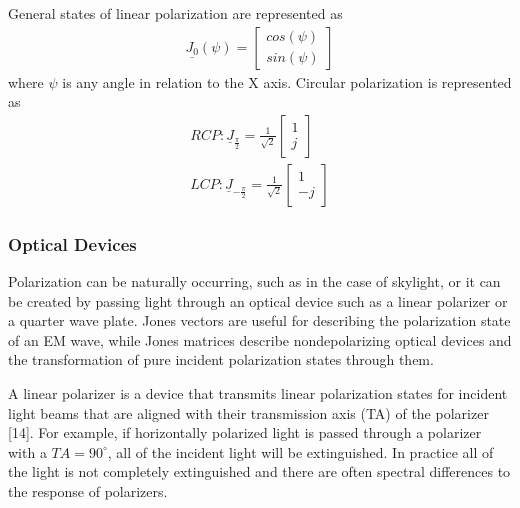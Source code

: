 %
General states of linear polarization are represented as
%
\begin{align}
    \underline{J_0}(\psi) =
    \begin{bmatrix}
        cos(\psi) \\
        sin(\psi)
    \end{bmatrix}
\end{align}
%
where $\psi$ is any angle in relation to the X axis.  Circular polarization is represented as
%
\begin{align}
    RCP: \underline{J}_{\frac{\pi}{2}} = \frac{1}{\sqrt{2}}
    \begin{bmatrix}
        1 \\
        j
    \end{bmatrix} \\
    LCP: \underline{J}_{-\frac{\pi}{2}} = \frac{1}{\sqrt{2}}
    \begin{bmatrix}
        1 \\
        -j
    \end{bmatrix}
\end{align}
%
\subsubsection{Optical Devices}
Polarization can be naturally occurring, such as in the case of skylight, or it can be created by passing light through an optical device such as a linear polarizer or a quarter wave plate.  Jones vectors are useful for describing the polarization state of an EM wave, while Jones matrices describe nondepolarizing optical devices and the transformation of pure incident polarization states through them.

A linear polarizer is a device that transmits linear polarization states for incident light beams that are aligned with their transmission axis (TA) of the polarizer [14].  For example, if horizontally polarized light is passed through a polarizer with a $TA = 90^{\circ}$, all of the incident light will be extinguished.  In practice all of the light is not completely extinguished and there are often spectral differences to the response of polarizers.

